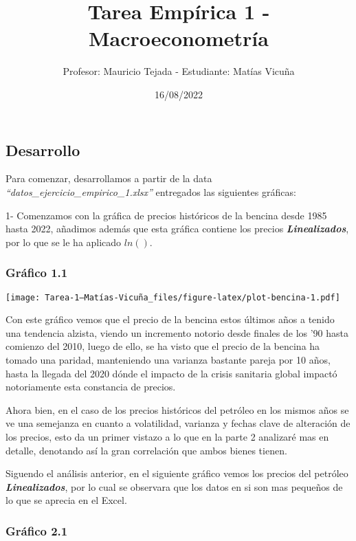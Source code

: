 \documentclass[
]{article}
\title{Tarea Empírica 1 - Macroeconometría}
\author{Profesor: Mauricio Tejada - Estudiante: Matías Vicuña}
\date{16/08/2022}
\begin{document}
\maketitle

\hypertarget{desarrollo}{%
\subsection{Desarrollo}\label{desarrollo}}

Para comenzar, desarrollamos a partir de la data
\emph{``datos\_ejercicio\_empirico\_1.xlsx''} entregados las siguientes
gráficas:

1- Comenzamos con la gráfica de precios históricos de la bencina desde
1985 hasta 2022, añadimos además que esta gráfica contiene los precios
\textbf{\emph{Linealizados}}, por lo que se le ha aplicado \(ln()\).

\hypertarget{gruxe1fico-1.1}{%
\subsubsection{Gráfico 1.1}\label{gruxe1fico-1.1}}

\texttt{[image: Tarea-1---Matías-Vicuña\_files/figure-latex/plot-bencina-1.pdf]}

Con este gráfico vemos que el precio de la bencina estos últimos años a
tenido una tendencia alzista, viendo un incremento notorio desde finales
de los '90 hasta comienzo del 2010, luego de ello, se ha visto que el
precio de la bencina ha tomado una paridad, manteniendo una varianza
bastante pareja por 10 años, hasta la llegada del 2020 dónde el impacto
de la crisis sanitaria global impactó notoriamente esta constancia de
precios.

Ahora bien, en el caso de los precios históricos del petróleo en los
mismos años se ve una semejanza en cuanto a volatilidad, varianza y
fechas clave de alteración de los precios, esto da un primer vistazo a
lo que en la parte 2 analizaré mas en detalle, denotando así la gran
correlación que ambos bienes tienen.

\newpage

Siguendo el análisis anterior, en el siguiente gráfico vemos los precios
del petróleo \textbf{\emph{Linealizados}}, por lo cual se observara que
los datos en si son mas pequeños de lo que se aprecia en el Excel.

\hypertarget{gruxe1fico-2.1}{%
\subsubsection{Gráfico 2.1}\label{gruxe1fico-2.1}}
\end{document}
